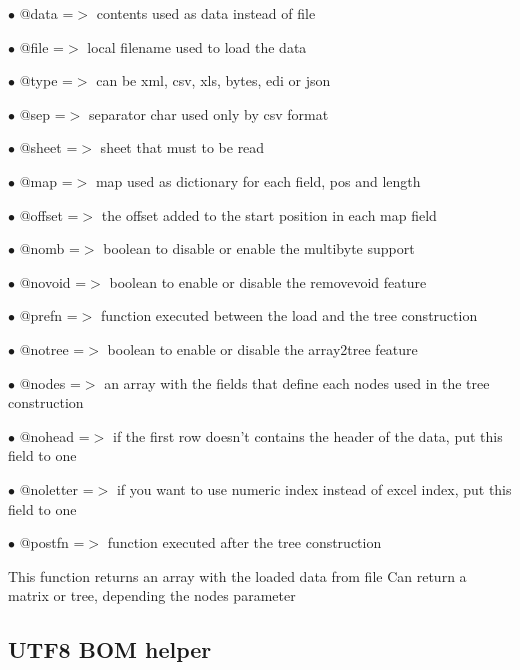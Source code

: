\documentclass[a4paper]{book}
\begin{document}
\begin{compactitem}
\item[\color{myblue}$\bullet$] @data     =$>$ contents used as data instead of file
\item[\color{myblue}$\bullet$] @file     =$>$ local filename used to load the data
\item[\color{myblue}$\bullet$] @type     =$>$ can be xml, csv, xls, bytes, edi or json
\item[\color{myblue}$\bullet$] @sep      =$>$ separator char used only by csv format
\item[\color{myblue}$\bullet$] @sheet    =$>$ sheet that must to be read
\item[\color{myblue}$\bullet$] @map      =$>$ map used as dictionary for each field, pos and length
\item[\color{myblue}$\bullet$] @offset   =$>$ the offset added to the start position in each map field
\item[\color{myblue}$\bullet$] @nomb     =$>$ boolean to disable or enable the multibyte support
\item[\color{myblue}$\bullet$] @novoid   =$>$ boolean to enable or disable the removevoid feature
\item[\color{myblue}$\bullet$] @prefn    =$>$ function executed between the load and the tree construction
\item[\color{myblue}$\bullet$] @notree   =$>$ boolean to enable or disable the array2tree feature
\item[\color{myblue}$\bullet$] @nodes    =$>$ an array with the fields that define each nodes used in the tree construction
\item[\color{myblue}$\bullet$] @nohead   =$>$ if the first row doesn't contains the header of the data, put this field to one
\item[\color{myblue}$\bullet$] @noletter =$>$ if you want to use numeric index instead of excel index, put this field to one
\item[\color{myblue}$\bullet$] @postfn   =$>$ function executed after the tree construction
\end{compactitem}

This function returns an array with the loaded data from file
Can return a matrix or tree, depending the nodes parameter

\hypertarget{toc155}{}
\subsection{UTF8 BOM helper}
\end{document}

